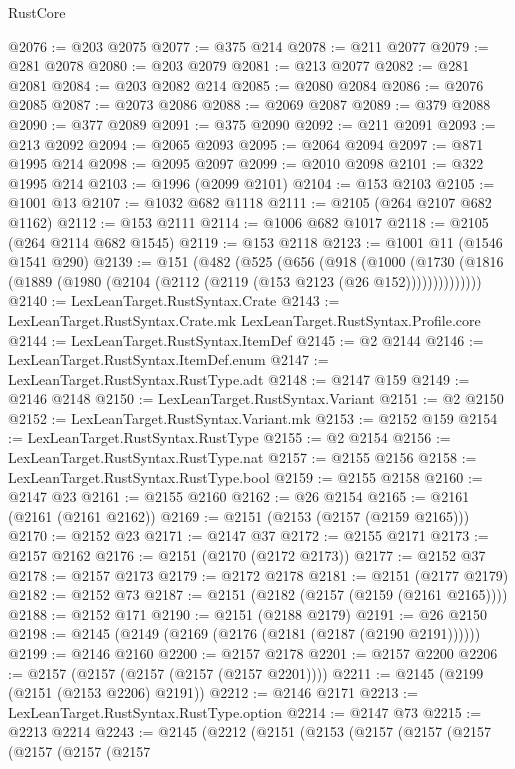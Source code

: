 \begin{lexlean}{RustCore}
\begin{coremodule}
@2076 := @203 @2075
@2077 := @375 @214
@2078 := @211 @2077
@2079 := @281 @2078
@2080 := @203 @2079
@2081 := @213 @2077
@2082 := @281 @2081
@2084 := @203 @2082 @214
@2085 := @2080 @2084
@2086 := @2076 @2085
@2087 := @2073 @2086
@2088 := @2069 @2087
@2089 := @379 @2088
@2090 := @377 @2089
@2091 := @375 @2090
@2092 := @211 @2091
@2093 := @213 @2092
@2094 := @2065 @2093
@2095 := @2064 @2094
@2097 := @871 @1995 @214
@2098 := @2095 @2097
@2099 := @2010 @2098
@2101 := @322 @1995 @214
@2103 := @1996 (@2099 @2101)
@2104 := @153 @2103
@2105 := @1001 @13
@2107 := @1032 @682 @1118
@2111 := @2105 (@264 @2107 @682 @1162)
@2112 := @153 @2111
@2114 := @1006 @682 @1017
@2118 := @2105 (@264 @2114 @682 @1545)
@2119 := @153 @2118
@2123 := @1001 @11 (@1546 @1541 @290)
@2139 := @151
    (@482
      (@525
        (@656
          (@918
            (@1000
              (@1730 (@1816 (@1889 (@1980 (@2104 (@2112 (@2119 (@153 @2123 (@26 @152))))))))))))))
@2140 := LexLeanTarget.RustSyntax.Crate
@2143 := LexLeanTarget.RustSyntax.Crate.mk LexLeanTarget.RustSyntax.Profile.core
@2144 := LexLeanTarget.RustSyntax.ItemDef
@2145 := @2 @2144
@2146 := LexLeanTarget.RustSyntax.ItemDef.enum
@2147 := LexLeanTarget.RustSyntax.RustType.adt
@2148 := @2147 @159
@2149 := @2146 @2148
@2150 := LexLeanTarget.RustSyntax.Variant
@2151 := @2 @2150
@2152 := LexLeanTarget.RustSyntax.Variant.mk
@2153 := @2152 @159
@2154 := LexLeanTarget.RustSyntax.RustType
@2155 := @2 @2154
@2156 := LexLeanTarget.RustSyntax.RustType.nat
@2157 := @2155 @2156
@2158 := LexLeanTarget.RustSyntax.RustType.bool
@2159 := @2155 @2158
@2160 := @2147 @23
@2161 := @2155 @2160
@2162 := @26 @2154
@2165 := @2161 (@2161 (@2161 @2162))
@2169 := @2151 (@2153 (@2157 (@2159 @2165)))
@2170 := @2152 @23
@2171 := @2147 @37
@2172 := @2155 @2171
@2173 := @2157 @2162
@2176 := @2151 (@2170 (@2172 @2173))
@2177 := @2152 @37
@2178 := @2157 @2173
@2179 := @2172 @2178
@2181 := @2151 (@2177 @2179)
@2182 := @2152 @73
@2187 := @2151 (@2182 (@2157 (@2159 (@2161 @2165))))
@2188 := @2152 @171
@2190 := @2151 (@2188 @2179)
@2191 := @26 @2150
@2198 := @2145 (@2149 (@2169 (@2176 (@2181 (@2187 (@2190 @2191))))))
@2199 := @2146 @2160
@2200 := @2157 @2178
@2201 := @2157 @2200
@2206 := @2157 (@2157 (@2157 (@2157 (@2157 @2201))))
@2211 := @2145 (@2199 (@2151 (@2153 @2206) @2191))
@2212 := @2146 @2171
@2213 := LexLeanTarget.RustSyntax.RustType.option
@2214 := @2147 @73
@2215 := @2213 @2214
@2243 := @2145
    (@2212
      (@2151
        (@2153
          (@2157
            (@2157
              (@2157
                (@2157
                  (@2157
                    (@2157

\end{coremodule}
\end{lexlean}
